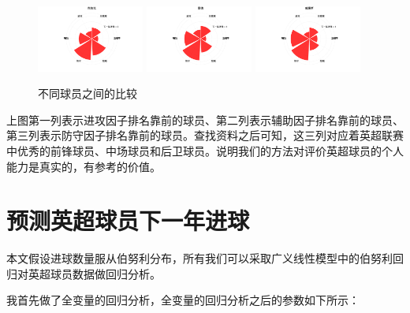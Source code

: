 \documentclass[12pt,a4paper,onecolumn]{article}
\begin{document}
\begin{figure}[H]
\includegraphics[width=100pt]{后卫克拉克.pdf}
\includegraphics[width=100pt]{后卫雷德.pdf}
\includegraphics[width=100pt]{后卫威廉斯.pdf}
\caption{\small{不同球员之间的比较}}
\end{figure}

上图第一列表示进攻因子排名靠前的球员、第二列表示辅助因子排名靠前的球员、第三列表示防守因子排名靠前的球员。查找资料之后可知，这三列对应着英超联赛中优秀的前锋球员、中场球员和后卫球员。说明我们的方法对评价英超球员的个人能力是真实的，有参考的价值。

\section{预测英超球员下一年进球}

本文假设进球数量服从伯努利分布，所有我们可以采取广义线性模型中的伯努利回归对英超球员数据做回归分析。

我首先做了全变量的回归分析，全变量的回归分析之后的参数如下所示：
\end{document}
